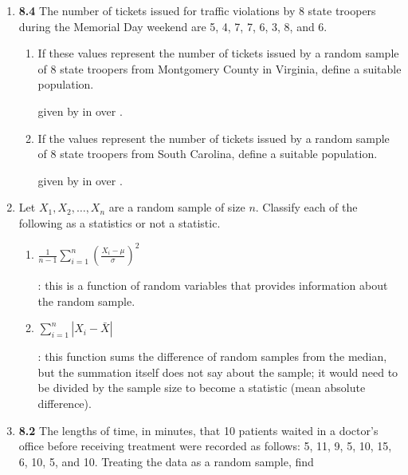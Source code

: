 \documentclass[basic, header]{nosvagor-notes}
\begin{document}
\begin{enumerate}[itemsep=2em]

  \item \textbf{8.4} The number of tickets issued for traffic violations by 8 state troopers
    during the Memorial Day weekend are 5, 4, 7, 7, 6, 3, 8, and 6.
    \begin{enumerate}

      \item If these values represent the number of tickets issued by a
        random sample of 8 state troopers from Montgomery County in Virginia,
        define a suitable population.

         given by  in
         over .

      \item  If the values represent the number of tickets issued by a random
        sample of 8 state troopers from South Carolina, define a suitable
        population.

         given by  in
         over .

    \end{enumerate}

  \item Let \(X_1, X_2,\ldots,X_n\) are a random sample of size \(n\). Classify
    each of the following as a statistics or not a statistic.
    \begin{enumerate}

      \item \(\displaystyle \frac{1}{n-1} \sum_{i=1}^{n} \left( \frac{X_i - \mu }{\sigma} \right)^2 \)

      : this is a function of random variables that provides
      information about the random sample.

      \item \(\displaystyle \sum_{i=1}^{n} \left| X_i - \bar{X} \right|  \)

      : this function sums the difference of random samples
      from the median, but the summation itself does not say about the sample;
      it would need to be divided by the sample size to become a statistic (mean absolute difference).

    \end{enumerate}

  \item \textbf{8.2} The lengths of time, in minutes, that 10 patients waited
    in a doctor’s office before receiving treatment were recorded as follows:
    5, 11, 9, 5, 10, 15, 6, 10, 5, and 10. Treating the data as a random
    sample, find
    \begin{enumerate}


\end{enumerate}
\end{enumerate}
\end{document}
